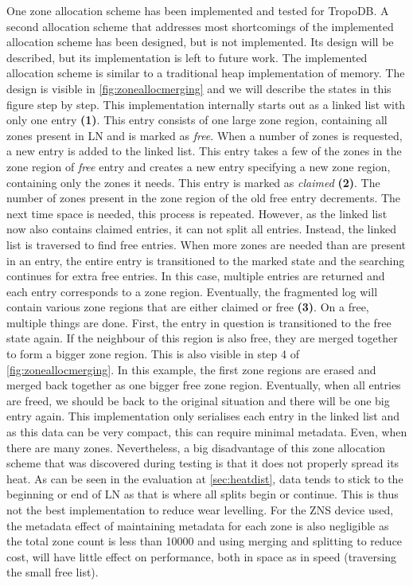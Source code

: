 One zone allocation scheme has been implemented and tested for TropoDB. A second allocation scheme that addresses most shortcomings of the implemented allocation scheme has been designed, but is not implemented. Its design will be described, but its implementation is left to future work. The implemented allocation scheme is similar to a traditional heap implementation of memory. The design is visible in \autoref{fig:zoneallocmerging} and we will describe the states in this figure step by step. This implementation internally starts out as a linked list with only one entry \textbf{(1)}. This entry consists of one large zone region, containing all zones present in LN and is marked as \textit{free}. When a number of zones is requested, a new entry is added to the linked list. This entry takes a few of the zones in the zone region of \textit{free} entry and creates a new entry specifying a new zone region, containing only the zones it needs. This entry is marked as \textit{claimed} \textbf{(2)}. The number of zones present in the zone region of the old free entry decrements. The next time space is needed, this process is repeated. However, as the linked list now also contains claimed entries, it can not split all entries. Instead, the linked list is traversed to find free entries. When more zones are needed than are present in an entry, the entire entry is transitioned to the marked state and the searching continues for extra free entries. In this case, multiple entries are returned and each entry corresponds to a zone region. Eventually, the fragmented log will contain various zone regions that are either claimed or free \textbf{(3)}. On a free, multiple things are done. First, the entry in question is transitioned to the free state again. If the neighbour of this region is also free, they are merged together to form a bigger zone region. This is also visible in step 4 of \autoref{fig:zoneallocmerging}. In this example, the first zone regions are erased and merged back together as one bigger free zone region. Eventually, when all entries are freed, we should be back to the original situation and there will be one big entry again. This implementation only serialises each entry in the linked list and as this data can be very compact, this can require minimal metadata. Even, when there are many zones. Nevertheless, a big disadvantage of this zone allocation scheme that was discovered during testing is that it does not properly spread its heat. As can be seen in the evaluation at \autoref{sec:heatdist}, data tends to stick to the beginning or end of LN as that is where all splits begin or continue. This is thus not the best implementation to reduce wear levelling. For the ZNS device used, the metadata effect of maintaining metadata for each zone is also negligible as the total zone count is less than 10000 and using merging and splitting to reduce cost, will have little effect on performance, both in space as in speed (traversing the small free list).


